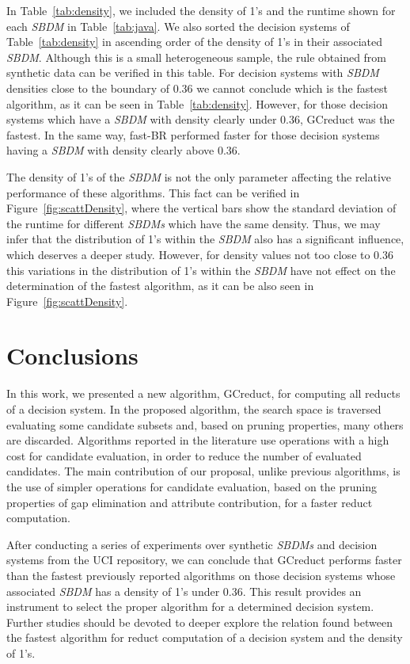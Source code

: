 \documentclass[number,preprint,review,12pt]{elsarticle}
\begin{document}
	\label{par:kind}
	In Table~\ref{tab:density}, we included the density of 1's and the runtime shown for each \textit{SBDM} in Table~\ref{tab:java}. We also sorted the decision systems of Table~\ref{tab:density} in ascending order of the density of 1's in their associated \textit{SBDM}. Although this is a small heterogeneous sample, the rule obtained from synthetic data can be verified in this table. For decision systems with \textit{SBDM} densities close to the boundary of 0.36 we cannot conclude which is the fastest algorithm, as it can be seen in Table~\ref{tab:density}. However, for those decision systems which have a \textit{SBDM} with density clearly under 0.36, GCreduct was the fastest. In the same way, fast-BR performed faster for those decision systems having a \textit{SBDM} with density clearly above 0.36.
	
	The density of 1's of the \textit{SBDM} is not the only parameter affecting the relative performance of these algorithms. This fact can be verified in Figure~\ref{fig:scattDensity}, where the vertical bars show the standard deviation of the runtime for different \textit{SBDMs} which have the same density. Thus, we may infer that the distribution of 1's within the \textit{SBDM} also has a significant influence, which deserves a deeper study. However, for density values not too close to 0.36 this variations in the distribution of 1's	within the \textit{SBDM} have not effect on the determination of the fastest algorithm, as it can be also seen in Figure~\ref{fig:scattDensity}.\label{par:distribution}

\section{Conclusions}\label{conclusions}
	In this work, we presented a new algorithm, GCreduct, for computing all reducts of a decision system. In the proposed algorithm, the search space is traversed evaluating some candidate subsets and, based on pruning properties, many others are discarded. Algorithms reported in the literature use operations with a high cost for candidate evaluation, in order to reduce the number of evaluated candidates. The main contribution of our proposal, unlike previous algorithms, is the use of simpler operations for candidate evaluation, based on the pruning properties of gap elimination and attribute contribution, for a faster reduct computation. 
	
	After conducting a series of experiments over synthetic \textit{SBDMs} and decision systems from the UCI repository, we can conclude that GCreduct performs faster than the fastest previously reported algorithms on those decision systems whose associated \textit{SBDM} has a density of 1's under 0.36. This result provides an instrument to select the proper algorithm for a determined decision system. Further studies should be devoted to deeper explore the relation found between the fastest algorithm for reduct computation of a decision system and the density of 1's. 
	
\end{document}
